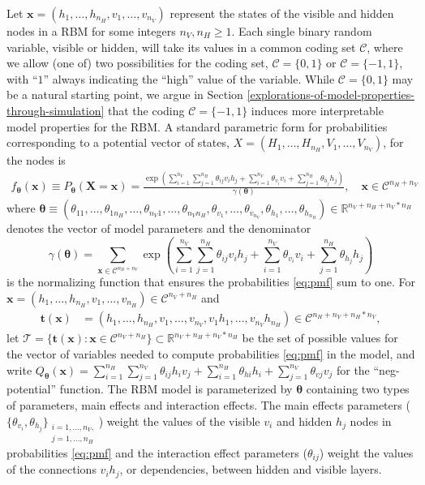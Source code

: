 \documentclass[]{article}
\theoremstyle{definition}
\newcommand{\nv}{{n_{\scriptscriptstyle V}}}
\newcommand{\nh}{{n_{\scriptscriptstyle H}}}
\begin{document}
Let \(\boldsymbol x = (h_1, \dots, h_\nh, v_1,\dots,v_\nv)\) represent
the states of the visible and hidden nodes in a RBM for some integers
\(\nv, \nh \ge 1\). Each single binary random variable, visible or
hidden, will take its values in a common coding set \(\mathcal{C}\),
where we allow (one of) two possibilities for the coding set,
\(\mathcal{C}=\{0,1\}\) or \(\mathcal{C}=\{-1,1\}\), with ``\(1\)''
always indicating the ``high'' value of the variable. While
\(\mathcal{C}=\{0,1\}\) may be a natural starting point, we argue in
Section \ref{explorations-of-model-properties-through-simulation} that
the coding \(\mathcal{C}=\{-1,1\}\) induces more interpretable model
properties for the RBM. A standard parametric form for probabilities
corresponding to a potential vector of states,
\(X = (H_1, \dots, H_\nh, V_1,\dots,V_\nv)\), for the nodes is
\begin{align}
\label{eq:pmf}
f_{\boldsymbol \theta} (\boldsymbol x)\equiv P_{\boldsymbol \theta}(\boldsymbol X = \boldsymbol x) = \frac{\exp\left(\sum\limits_{i = 1}^\nv \sum\limits_{j=1}^\nh \theta_{ij} v_i h_j + \sum\limits_{i = 1}^\nv\theta_{v_i} v_i + \sum\limits_{j = 1}^\nh\theta_{h_j} h_j\right)}{\gamma(\boldsymbol \theta)}, \quad \boldsymbol x \in \mathcal{C}^{\nh + \nv} 
\end{align} where
\(\boldsymbol \theta \equiv (\theta_{11}, \dots, \theta_{1\nh}, \dots, \theta_{\nv 1}, \dots, \theta_{\nv \nh}, \theta_{v_1}, \dots, \theta_{v_\nv}, \theta_{h_1}, \dots, \theta_{h_\nh}) \in \mathbb{R}^{\nv + \nh + \nv*\nh}\)
denotes the vector of model parameters and the denominator \[
\gamma(\boldsymbol \theta) = \sum_{\boldsymbol x \in \mathcal{C}^{\nh+\nv}}\exp\left(\sum_{i = 1}^\nv \sum_{j=1}^\nh \theta_{ij} v_i h_j + \sum_{i = 1}^\nv\theta_{v_i} v_i + \sum_{j = 1}^\nh\theta_{h_j} h_j\right)
\] is the normalizing function that ensures the probabilities
\eqref{eq:pmf} sum to one. For
\(\boldsymbol x = (h_1, \dots, h_\nh, v_1, \dots, v_\nh) \in \mathcal{C}^{\nv + \nh}\)
and \begin{align}
\boldsymbol t(\boldsymbol x) &= (h_1, \dots, h_\nh, v_1, \dots, v_\nv, v_1 h_1, \dots, v_\nv h_\nh) \in \mathcal{C}^{\nh + \nv + \nh*\nv}, \label{eq:t}
\end{align} let
\(\mathcal{T} = \{\boldsymbol t(\boldsymbol x): \boldsymbol x \in \mathcal{C}^{\nv + \nh}\} \subset \mathbb{R}^{\nv + \nh + \nv * \nh}\)
be the set of possible values for the vector of variables needed to
compute probabilities \eqref{eq:pmf} in the model, and write
\(Q_{\boldsymbol \theta}(\boldsymbol x) = \sum\limits_{i = 1}^\nh\sum\limits_{j=1}^\nv \theta_{ij} h_i v_j + \sum\limits_{i = 1}^\nh\theta_{hi} h_i + \sum\limits_{j = 1}^\nv\theta_{vj} v_j\)
for the ``neg-potential'' function. The RBM model is parameterized by
\(\boldsymbol \theta\) containing two types of parameters, main effects
and interaction effects. The main effects parameters
(\(\{\theta_{v_i}, \theta_{h_j}\}_{\substack{i = 1, \dots, \nv,\\j = 1, \dots, \nh}}\))
weight the values of the visible \(v_i\) and hidden \(h_j\) nodes in
probabilities \eqref{eq:pmf} and the interaction effect parameters
(\(\theta_{ij}\)) weight the values of the connections \(v_i h_j\), or
dependencies, between hidden and visible layers.
\end{document}
